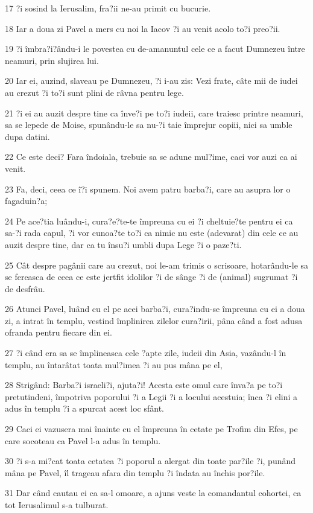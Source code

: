 \par 17 ?i sosind la Ierusalim, fra?ii ne-au primit cu bucurie.
\par 18 Iar a doua zi Pavel a mers cu noi la Iacov ?i au venit acolo to?i preo?ii.
\par 19 ?i îmbra?i?ându-i le povestea cu de-amanuntul cele ce a facut Dumnezeu între neamuri, prin slujirea lui.
\par 20 Iar ei, auzind, slaveau pe Dumnezeu, ?i i-au zis: Vezi frate, câte mii de iudei au crezut ?i to?i sunt plini de râvna pentru lege.
\par 21 ?i ei au auzit despre tine ca înve?i pe to?i iudeii, care traiesc printre neamuri, sa se lepede de Moise, spunându-le sa nu-?i taie împrejur copiii, nici sa umble dupa datini.
\par 22 Ce este deci? Fara îndoiala, trebuie sa se adune mul?ime, caci vor auzi ca ai venit.
\par 23 Fa, deci, ceea ce î?i spunem. Noi avem patru barba?i, care au asupra lor o fagaduin?a;
\par 24 Pe ace?tia luându-i, cura?e?te-te împreuna cu ei ?i cheltuie?te pentru ei ca sa-?i rada capul, ?i vor cunoa?te to?i ca nimic nu este (adevarat) din cele ce au auzit despre tine, dar ca tu însu?i umbli dupa Lege ?i o paze?ti.
\par 25 Cât despre pagânii care au crezut, noi le-am trimis o scrisoare, hotarându-le sa se fereasca de ceea ce este jertfit idolilor ?i de sânge ?i de (animal) sugrumat ?i de desfrâu.
\par 26 Atunci Pavel, luând cu el pe acei barba?i, cura?indu-se împreuna cu ei a doua zi, a intrat în templu, vestind împlinirea zilelor cura?irii, pâna când a fost adusa ofranda pentru fiecare din ei.
\par 27 ?i când era sa se împlineasca cele ?apte zile, iudeii din Asia, vazându-l în templu, au întarâtat toata mul?imea ?i au pus mâna pe el,
\par 28 Strigând: Barba?i israeli?i, ajuta?i! Acesta este omul care înva?a pe to?i pretutindeni, împotriva poporului ?i a Legii ?i a locului acestuia; înca ?i elini a adus în templu ?i a spurcat acest loc sfânt.
\par 29 Caci ei vazusera mai înainte cu el împreuna în cetate pe Trofim din Efes, pe care socoteau ca Pavel l-a adus în templu.
\par 30 ?i s-a mi?cat toata cetatea ?i poporul a alergat din toate par?ile ?i, punând mâna pe Pavel, îl trageau afara din templu ?i îndata au închis por?ile.
\par 31 Dar când cautau ei ca sa-l omoare, a ajuns veste la comandantul cohortei, ca tot Ierusalimul s-a tulburat.
